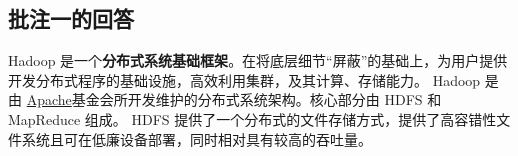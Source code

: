 
\subsection{批注一的回答}
\label{sec:fix:bl1}

Hadoop 是一个\textbf{分布式系统基础框架}。在将底层细节“屏蔽”的基础上，为用户提供开发分布式程序的基础设施，高效利用集群，及其计算、存储能力。
Hadoop 是由 \href{https://www.apache.org}{Apache}基金会所开发维护的分布式系统架构。核心部分由 HDFS 和 MapReduce 组成。
HDFS 提供了一个分布式的文件存储方式，提供了高容错性文件系统且可在低廉设备部署，同时相对具有较高的吞吐量。